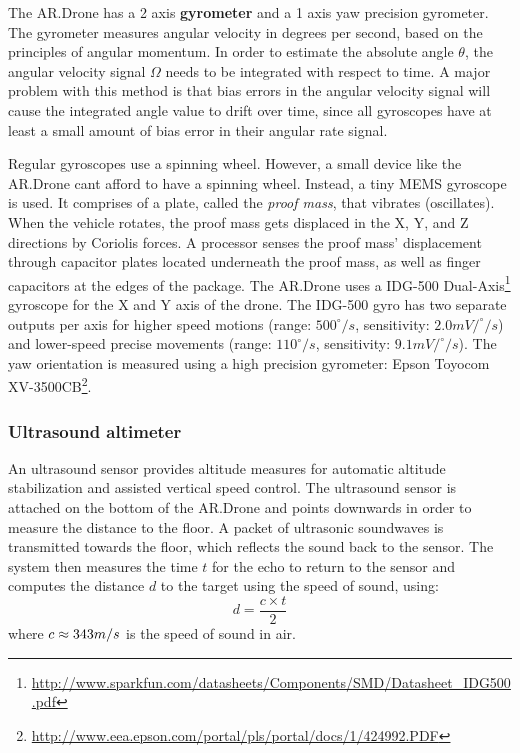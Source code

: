 The AR.Drone has a 2 axis \textbf{gyrometer} and a 1 axis yaw precision gyrometer.
The gyrometer measures angular velocity in degrees per second, based on the principles of angular momentum.
In order to estimate the absolute angle $\theta$, the angular velocity signal $\Omega$ needs to be integrated with respect to time.
A major problem with this method is that bias errors in the angular velocity signal will cause the integrated angle value to drift over time, since all gyroscopes have at least a small amount of bias error in their angular rate signal.

Regular gyroscopes use a spinning wheel.
However, a small device like the AR.Drone cant afford to have a spinning wheel.
Instead, a tiny MEMS gyroscope is used. 
It comprises of a plate, called the \textit{proof mass}, that vibrates (oscillates).
When the vehicle rotates, the proof mass gets displaced in the X, Y, and Z directions by Coriolis forces.
A processor senses the proof mass’ displacement through capacitor plates located underneath the proof mass, as well as finger capacitors at the edges of the package.
The AR.Drone uses a IDG-500 Dual-Axis\footnote{\url{http://www.sparkfun.com/datasheets/Components/SMD/Datasheet_IDG500.pdf}} gyroscope for the X and Y axis of the drone.
The IDG-500 gyro has two separate outputs per axis for higher speed motions (range: $500^{\circ}/s$, sensitivity: $2.0mV/^{\circ}/s$) and lower-speed precise movements (range: $110^{\circ}/s$, sensitivity: $9.1mV/^{\circ}/s$).
The yaw orientation is measured using a high precision gyrometer: Epson Toyocom XV-3500CB\footnote{\url{http://www.eea.epson.com/portal/pls/portal/docs/1/424992.PDF}}.


\subsubsection{Ultrasound altimeter}
An ultrasound sensor provides altitude measures for automatic altitude stabilization and assisted vertical speed control.
The ultrasound sensor is attached on the bottom of the AR.Drone and points downwards in order to measure the distance to the floor.
A packet of ultrasonic soundwaves is transmitted towards the floor, which reflects the sound back to the sensor.
The system then measures the time $t$ for the echo to return to the sensor and computes the distance $d$ to the target using the speed of sound, using:
\begin{equation}
d = \frac{c \times t}{2}
\end{equation}
where $c \approx 343\small{m/s}$ is the speed of sound in air.

